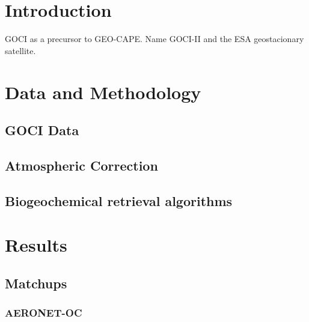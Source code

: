 \documentclass[12pt,draft]{spieman}  %
\begin{document}
\begin{spacing}{2}   %

\section{Introduction}
GOCI as a precursor to GEO-CAPE. 
Name GOCI-II and the ESA geostacionary satellite.


\section{Data and Methodology} %
\subsection{GOCI Data}

\subsection{Atmospheric Correction}

\subsection{Biogeochemical retrieval algorithms}

\section{Results}
\label{sec:Results}
\subsection{Matchups}
\subsubsection{AERONET-OC}


\end{spacing}
\end{document}
